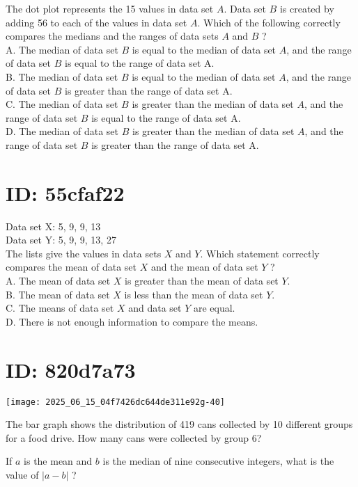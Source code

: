 The dot plot represents the 15 values in data set $A$. Data set $B$ is created by adding 56 to each of the values in data set $A$. Which of the following correctly compares the medians and the ranges of data sets $A$ and $B$ ?\\
A. The median of data set $B$ is equal to the median of data set $A$, and the range of data set $B$ is equal to the range of data set A.\\
B. The median of data set $B$ is equal to the median of data set $A$, and the range of data set $B$ is greater than the range of data set A.\\
C. The median of data set $B$ is greater than the median of data set $A$, and the range of data set $B$ is equal to the range of data set A.\\
D. The median of data set $B$ is greater than the median of data set $A$, and the range of data set $B$ is greater than the range of data set A.

\section*{ID: 55cfaf22}
Data set X: 5, 9, 9, 13\\
Data set Y: 5, 9, 9, 13, 27\\
The lists give the values in data sets $X$ and $Y$. Which statement correctly compares the mean of data set $X$ and the mean of data set $Y$ ?\\
A. The mean of data set $X$ is greater than the mean of data set $Y$.\\
B. The mean of data set $X$ is less than the mean of data set $Y$.\\
C. The means of data set $X$ and data set $Y$ are equal.\\
D. There is not enough information to compare the means.

\section*{ID: 820d7a73}
\begin{center}
\texttt{[image: 2025\_06\_15\_04f7426dc644de311e92g-40]}
\end{center}

The bar graph shows the distribution of 419 cans collected by 10 different groups for a food drive. How many cans were collected by group 6?

If $a$ is the mean and $b$ is the median of nine consecutive integers, what is the value of $|a-b|$ ?

